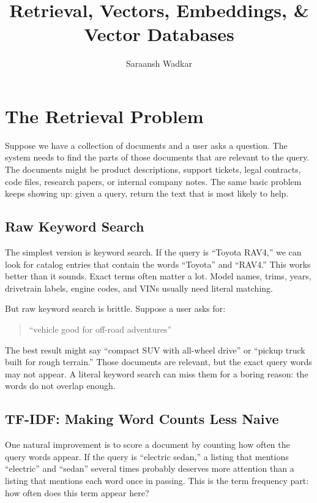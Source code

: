 \documentclass[12pt]{article}
\title{Retrieval, Vectors, Embeddings, \& Vector Databases}
\author{Saraansh Wadkar}
\date{}
\begin{document}
\maketitle

\section{The Retrieval Problem}

Suppose we have a collection of documents and a user asks a question. The
system needs to find the parts of those documents that are relevant to the
query. The documents might be product descriptions, support tickets, legal
contracts, code files, research papers, or internal company notes. The
same basic problem keeps showing up: given a query, return the text that
is most likely to help.

\subsection{Raw Keyword Search}

The simplest version is keyword search. If the query is ``Toyota RAV4,''
we can look for catalog entries that contain the words ``Toyota'' and
``RAV4.'' This works better than it sounds. Exact terms often matter a
lot. Model names, trims, years, drivetrain labels, engine codes, and VINs
usually need literal matching.

But raw keyword search is brittle. Suppose a user asks for:

\begin{quote}
``vehicle good for off-road adventures''
\end{quote}

The best result might say ``compact SUV with all-wheel drive'' or
``pickup truck built for rough terrain.'' Those documents are relevant,
but the exact query words may not appear. A literal keyword search can
miss them for a boring reason: the words do not overlap enough.

\subsection{TF-IDF: Making Word Counts Less Naive}

One natural improvement is to score a document by counting how often the
query words appear. If the query is ``electric sedan,'' a listing that
mentions ``electric'' and ``sedan'' several times probably deserves more
attention than a listing that mentions each word once in passing. This is
the term frequency part: how often does this term appear here?
\end{document}
